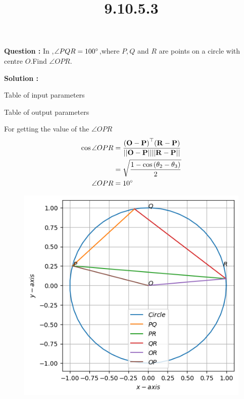 \documentclass[12pt]{article}
\let\vec\mathbf
\providecommand{\brak}[1]{\ensuremath{\left(#1\right)}}
\providecommand{\norm}[1]{\ensuremath{\lvert|#1\rvert|}}
\begin{document}
\title{\textbf{9.10.5.3}}
\date{}
\maketitle
\textbf{Question :} In ,$\angle PQR = 100\degree$,where $P,Q$ and $R$ are points on a circle with centre $O$.Find $\angle OPR$.

\textbf{Solution :}
\begin{table}[H]
    \centering
    
    \caption{Table of input parameters}
    \label{tab:tab:1}
\end{table}

\begin{table}[H]
    \centering
    
    \caption{Table of output parameters}
    \label{tab:tab:2}
\end{table}
For getting the value of the $\angle OPR$
\begin{align}
    \cos{\angle OPR }&= \frac{\vec{\brak{O-P}}^{\top}\vec{\brak{R-P}}}{\vec{\norm{O-P}\norm{R-P}}}\\
	&=\sqrt{\frac{1-\cos{\brak{\theta_2-\theta_3}}}{2}}\\
	\angle OPR &= 10\degree
  \end{align}

  \begin{figure}[H]                                 
	  \centering                          
	  \includegraphics[width=\columnwidth]{fig/9.10.5.3.png}
\caption{}
\label{fig:fig:9.10.5.3}                        
  \end{figure}
\end{document}

